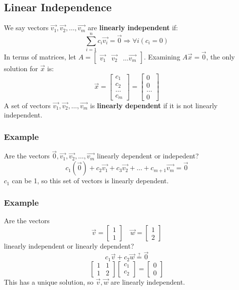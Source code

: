 \documentclass{math}
\begin{document}
\subsection*{Linear Independence}
We say vectors \( \vec{v_1},\vec{v_2},\dots,\vec{v_m} \) are \textbf{linearly
independent} if:
\[ \sum_{i=1}^{n}c_i\vec{v_i} = \vec{0} \Rightarrow \forall{i}(c_i = 0) \]
In terms of matrices, let \( A = \begin{bmatrix}\vec{v_1} & \vec{v_2} & \dots
\vec{v_m}\end{bmatrix} \). Examining \( A\vec{x} = \vec{0} \), the only
solution for \( \vec{x} \) is:
\[ \vec{x} = \begin{bmatrix}c_1 \\ c_2 \\ \dots \\ c_m\end{bmatrix} =
  \begin{bmatrix} 0 \\ 0 \\ \dots \\ 0\end{bmatrix} \]
A set of vectors \( \vec{v_1},\vec{v_2},\dots,\vec{v_m} \) is \textbf{linearly
dependent} if it is not linearly independent.

\subsubsection*{Example}
Are the vectors \( \vec{0},\vec{v_1},\vec{v_2},\dots,\vec{v_m} \) linearly
dependent or indepedent?
\[ c_1(\vec{0})+c_2\vec{v_1}+c_3\vec{v_2}+\dots+c_{m+1}\vec{v_m} = \vec{0} \]
\( c_1 \) can be 1, so this set of vectors is linearly dependent.

\subsubsection*{Example}
Are the vectors
\[ \vec{v} = \begin{bmatrix}1 \\ 1\end{bmatrix}\quad
  \vec{w} = \begin{bmatrix}1 \\ 2\end{bmatrix} \]
linearly independent or linearly dependent?
\[ c_1\vec{v}+c_2\vec{w} \stackrel{?}{=} \vec{0} \]
\[ \begin{bmatrix}1 & 1 \\ 1 & 2\end{bmatrix}
  \begin{bmatrix}c_1 \\ c_2\end{bmatrix} =
  \begin{bmatrix}0 \\ 0\end{bmatrix} \]
This has a unique solution, so \( \vec{v},\vec{w} \) are linearly independent.
\end{document}
